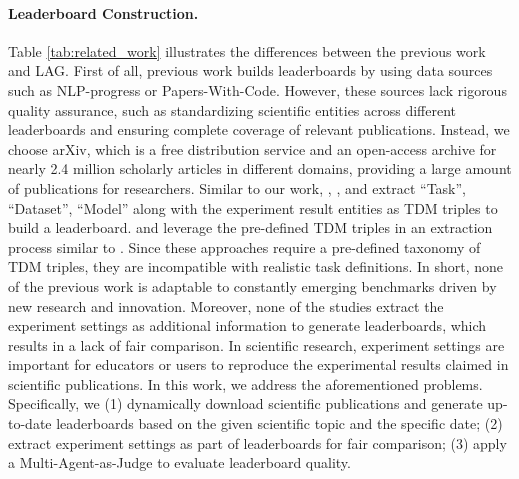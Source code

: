 \paragraph{Leaderboard Construction.}
Table \ref{tab:related_work} illustrates the differences between the previous work and LAG.
First of all, previous work builds leaderboards by using data sources such as NLP-progress or Papers-With-Code. However, these sources lack rigorous quality assurance, such as standardizing scientific entities across different leaderboards and ensuring complete coverage of relevant publications. Instead, we choose arXiv, which is a free distribution service and an open-access archive for nearly 2.4 million scholarly articles in different domains, providing a large amount of publications for researchers.
Similar to our work, \citet{hou-etal-2019-identification}, \citet{kardas-etal-2020-axcell}, and \citet{Singh2024LEGOBenchSL} extract ``Task'', ``Dataset'', ``Model'' along with the experiment result entities as TDM triples to build a leaderboard. 
\citet{yang-etal-2022-telin} and \citet{KABENAMUALU2023ORKGLeaderboardsAS} leverage the pre-defined TDM triples in an extraction process similar to \citet{hou-etal-2019-identification}.  
Since these approaches require a pre-defined taxonomy of TDM triples, they are incompatible with realistic task definitions. In short, none of the previous work is adaptable to constantly emerging benchmarks driven by new research and innovation. 
Moreover, none of the studies extract the experiment settings as additional information to generate leaderboards, which results in a lack of fair comparison. In scientific research, experiment settings are important for educators or users to reproduce the experimental results claimed in scientific publications. 
In this work, we address the
aforementioned problems. Specifically, we (1) dynamically download scientific publications and generate up-to-date leaderboards based on the given scientific topic and the specific date; (2) extract experiment settings as part of leaderboards for fair comparison; (3) apply a Multi-Agent-as-Judge to evaluate leaderboard quality.